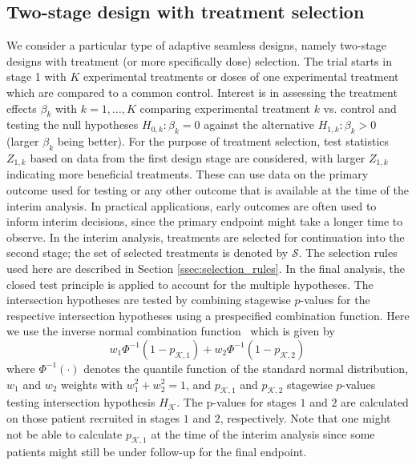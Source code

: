 \documentclass[bimj,fleqn]{w-art}
\theoremstyle{plain}
\theoremstyle{definition}
\begin{document}
\subsection{Two-stage design with treatment selection}
\label{ssec:two_stage_design_with_treatment_selection}
We consider a particular type of adaptive seamless designs, namely two-stage designs with treatment (or more specifically dose) selection. The trial starts in stage 1 with $K$ experimental treatments or doses of one experimental treatment which are compared to a common control. Interest is in assessing the treatment effects $\beta_k$ with $k=1,\dots, K$ comparing experimental treatment $k$ vs. control and testing the null hypotheses $H_{0,k}: \beta_k=0$ against the alternative $H_{1,k}: \beta_k>0$ (larger $\beta_k$ being better). For the purpose of treatment selection, test statistics $Z_{1,k}$ based on data from the first design stage are considered, with larger $Z_{1,k}$ indicating more beneficial treatments. These can use data on the primary outcome used for testing or any other outcome that is available at the time of the interim analysis. In practical applications, early outcomes are often used to inform interim decisions, since the primary endpoint might take a longer time to observe. In the interim analysis, treatments are selected for continuation into the second stage; the set of selected treatments is denoted by $\mathcal{S}$. The selection rules used here are described in Section \ref{ssec:selection_rules}. In the final analysis, the closed test principle is applied to account for the multiple hypotheses. The intersection hypotheses are tested by combining stagewise $p$-values for the respective intersection hypotheses using a prespecified combination function. Here we use the inverse normal combination function~\citep{lehmacher_adaptive_1999} which is given by
\begin{equation}
   w_1 \Phi^{-1}(1-p_{\mathcal{K},1}) + w_2 \Phi^{-1}(1-p_{\mathcal{K},2}) \,
\end{equation}
where $\Phi^{-1}(\cdot)$ denotes the quantile function of the standard normal distribution, $w_1$ and $w_2$ weights with $w_1^2+w_2^2 = 1$, and $p_{\mathcal{K},1}$ and $p_{\mathcal{K},2}$ stagewise $p$-values testing intersection hypothesis $H_{\mathcal{K}}$. The p-values for stages $1$ and $2$ are calculated on those patient recruited in stages $1$ and $2$, respectively. Note that one might not be able to calculate $p_{\mathcal{K},1}$ at the time of the interim analysis since some patients might still be under follow-up for the final endpoint.
\end{document}
